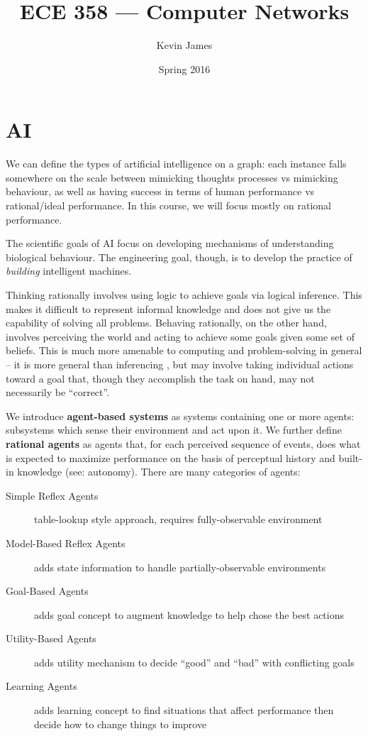\documentclass[12pt]{article}
\begin{document}
\title{ECE 358 --- Computer Networks}
\author{Kevin James}
\date{\vspace{-2ex}Spring 2016}
\maketitle\HRule

\tableofcontents
\newpage

\section{AI}
We can define the types of artificial intelligence on a graph: each instance falls somewhere on the scale between mimicking thoughts processes vs mimicking behaviour, as well as having success in terms of human performance vs rational/ideal performance. In this course, we will focus mostly on rational performance.

The scientific goals of AI focus on developing mechanisms of understanding biological behaviour. The engineering goal, though, is to develop the practice of {\it building} intelligent machines.

Thinking rationally involves using logic to achieve goals via logical inference. This makes it difficult to represent informal knowledge and does not give us the capability of solving all problems. Behaving rationally, on the other hand, involves perceiving the world and acting to achieve some goals given some set of beliefs. This is much more amenable to computing and problem-solving in general -- it is more general than inferencing , but may involve taking individual actions toward a goal that, though they accomplish the task on hand, may not necessarily be ``correct''.

We introduce {\bf agent-based systems} as systems containing one or more agents: subsystems which sense their environment and act upon it. We further define {\bf rational agents} as agents that, for each perceived sequence of events, does what is expected to maximize performance on the basis of perceptual history and built-in knowledge (see: autonomy). There are many categories of agents:
\begin{description}
\item[Simple Reflex Agents] table-lookup style approach, requires fully-observable environment
\item[Model-Based Reflex Agents] adds state information to handle partially-observable environments
\item[Goal-Based Agents] adds goal concept to augment knowledge to help chose the best actions
\item[Utility-Based Agents] adds utility mechanism to decide ``good'' and ``bad'' with conflicting goals
\item[Learning Agents]adds learning concept to find situations that affect performance then decide how to change things to improve
\end{description}
\end{document}

